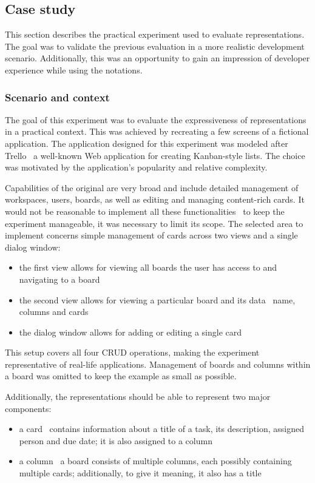 \subsection{Case study}\label{subsec:case-study}
This section describes the practical experiment used to evaluate representations.
The goal was to validate the previous evaluation in a more realistic development scenario.
Additionally, this was an opportunity to  gain an impression of developer experience while using the notations.

\subsubsection{Scenario and context}
The goal of this experiment was to evaluate the expressiveness of representations in a practical context.
This was achieved by recreating a few screens of a fictional application.
The application designed for this experiment was modeled after Trello \textendash\ a well-known Web application for creating Kanban-style lists.
The choice was motivated by the application's popularity and relative complexity.

Capabilities of the original are very broad and include detailed management of workspaces, users, boards, as well as editing and managing content-rich cards.
It would not be reasonable to implement all these functionalities \textendash\ to keep the experiment manageable, it was necessary to limit its scope.
The selected area to implement concerns simple management of cards across two views and a single dialog window:
\begin{itemize}
    \item the first view allows for viewing all boards the user has access to and navigating to a board
    \item the second view allows for viewing a particular board and its data \textendash\ name, columns and cards
    \item the dialog window allows for adding or editing a single card
\end{itemize}
This setup covers all four CRUD operations, making the experiment representative of real-life applications.
Management of boards and columns within a board was omitted to keep the example as small as possible.

Additionally, the representations should be able to represent two major components:
\begin{itemize}
    \item a card \textendash\ contains information about a title of a task, its description, assigned person and due date; it is also assigned to a column
    \item a column \textendash\ a board consists of multiple columns, each possibly containing multiple cards; additionally, to give it meaning, it also has a title
\end{itemize}

